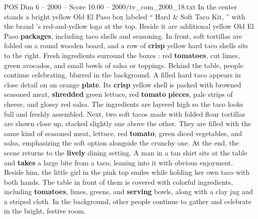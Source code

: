 \begin{textsample}{POS Dim 6 – 2000 – Score 10.00 – 2000/tv\_com\_2000\_18.txt}
In the center stands a bright yellow Old El Paso box labeled “ Hard \& Soft Taco Kit, ” with the brand ’s red-and-yellow logo at the top.
Beside it are additional yellow Old El Paso \textbf{packages}, including taco shells and seasoning.
In front, soft tortillas are folded on a round wooden board, and a row of \textbf{crisp} yellow hard taco shells sits to the right.
Fresh ingredients surround the boxes : red \textbf{tomatoes}, cut limes, green avocados, and small bowls of salsa or toppings.
Behind the table, people continue celebrating, blurred in the background.
A filled hard taco appears in close detail on an orange \textbf{plate}.
Its \textbf{crisp} yellow shell is packed with browned seasoned meat, \textbf{shredded} green lettuce, red \textbf{tomato} \textbf{pieces}, pale strips of cheese, and glossy red salsa.
The ingredients are layered high so the taco looks full and freshly assembled.
Next, two soft tacos made with folded flour tortillas are shown close up, stacked slightly one above the other.
They are filled with the same kind of seasoned meat, lettuce, red \textbf{tomato}, green diced vegetables, and salsa, emphasizing the soft option alongside the crunchy one.
At the end, the scene returns to the \textbf{lively} dining setting.
A man in a tan shirt sits at the table and \textbf{takes} a large bite from a taco, leaning into it with obvious enjoyment.
Beside him, the little girl in the pink top smiles while holding her own taco with both hands.
The table in front of them is covered with colorful ingredients, including \textbf{tomatoes}, limes, greens, and \textbf{serving} bowls, along with a clay jug and a striped cloth.
In the background, other people continue to gather and celebrate in the bright, festive room.

\end{textsample}
